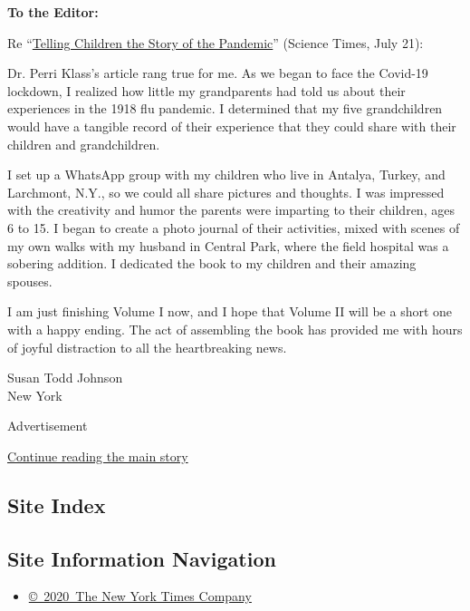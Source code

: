\textbf{To the Editor:}

Re
``\href{https://www.nytimes3xbfgragh.onion/2020/07/14/well/family/children-coronavirus-stories.html}{Telling
Children the Story of the Pandemic}'' (Science Times, July 21):

Dr. Perri Klass's article rang true for me. As we began to face the
Covid-19 lockdown, I realized how little my grandparents had told us
about their experiences in the 1918 flu pandemic. I determined that my
five grandchildren would have a tangible record of their experience that
they could share with their children and grandchildren.

I set up a WhatsApp group with my children who live in Antalya, Turkey,
and Larchmont, N.Y., so we could all share pictures and thoughts. I was
impressed with the creativity and humor the parents were imparting to
their children, ages 6 to 15. I began to create a photo journal of their
activities, mixed with scenes of my own walks with my husband in Central
Park, where the field hospital was a sobering addition. I dedicated the
book to my children and their amazing spouses.

I am just finishing Volume I now, and I hope that Volume II will be a
short one with a happy ending. The act of assembling the book has
provided me with hours of joyful distraction to all the heartbreaking
news.

Susan Todd Johnson\\
New York

Advertisement

\protect\hyperlink{after-bottom}{Continue reading the main story}

\hypertarget{site-index}{%
\subsection{Site Index}\label{site-index}}

\hypertarget{site-information-navigation}{%
\subsection{Site Information
Navigation}\label{site-information-navigation}}

\begin{itemize}
\tightlist
\item
  \href{https://help.nytimes3xbfgragh.onion/hc/en-us/articles/115014792127-Copyright-notice}{©~2020~The
  New York Times Company}
\end{itemize}

